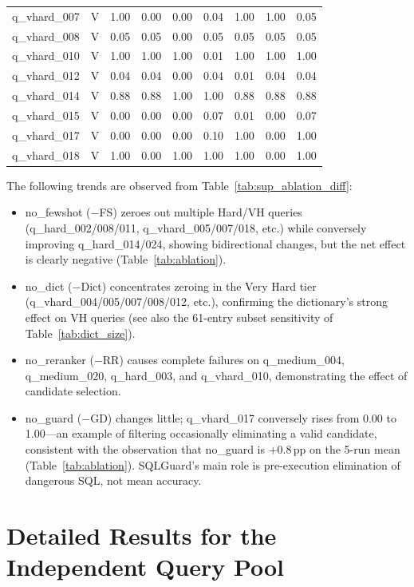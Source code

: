 \begin{table}[htbp]
\begin{tabular}{@{}llccccccc@{}}
    q\_vhard\_007 & V & 1.00 & 0.00 & 0.00 & 0.04 & 1.00 & 1.00 & 0.05 \\
    q\_vhard\_008 & V & 0.05 & 0.05 & 0.00 & 0.05 & 0.05 & 0.05 & 0.05 \\
    q\_vhard\_010 & V & 1.00 & 1.00 & 1.00 & 0.01 & 1.00 & 1.00 & 1.00 \\
    q\_vhard\_012 & V & 0.04 & 0.04 & 0.00 & 0.04 & 0.01 & 0.04 & 0.04 \\
    q\_vhard\_014 & V & 0.88 & 0.88 & 1.00 & 1.00 & 0.88 & 0.88 & 0.88 \\
    q\_vhard\_015 & V & 0.00 & 0.00 & 0.00 & 0.07 & 0.01 & 0.00 & 0.07 \\
    q\_vhard\_017 & V & 0.00 & 0.00 & 0.00 & 0.10 & 1.00 & 0.00 & 1.00 \\
    q\_vhard\_018 & V & 1.00 & 0.00 & 1.00 & 1.00 & 1.00 & 0.00 & 1.00 \\
  \bottomrule
\end{tabular}
\end{table}


The following trends are observed from Table~\ref{tab:sup_ablation_diff}:
\begin{itemize}
  \item no\_fewshot ($-$FS) zeroes out multiple Hard/VH queries (q\_hard\_002/008/011, q\_vhard\_005/007/018, etc.) while conversely improving q\_hard\_014/024, showing bidirectional changes, but the net effect is clearly negative (Table~\ref{tab:ablation}).
  \item no\_dict ($-$Dict) concentrates zeroing in the Very Hard tier (q\_vhard\_004/005/007/008/012, etc.), confirming the dictionary's strong effect on VH queries (see also the 61-entry subset sensitivity of Table~\ref{tab:dict_size}).
  \item no\_reranker ($-$RR) causes complete failures on q\_medium\_004, q\_medium\_020, q\_hard\_003, and q\_vhard\_010, demonstrating the effect of candidate selection.
  \item no\_guard ($-$GD) changes little; q\_vhard\_017 conversely rises from 0.00 to 1.00---an example of filtering occasionally eliminating a valid candidate, consistent with the observation that no\_guard is $+$0.8\,pp on the 5-run mean (Table~\ref{tab:ablation}). SQLGuard's main role is pre-execution elimination of dangerous SQL, not mean accuracy.
\end{itemize}


\section{Detailed Results for the Independent Query Pool}


